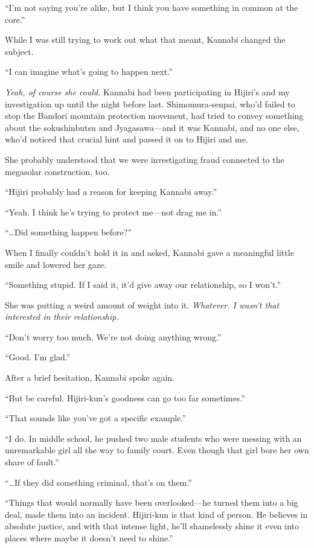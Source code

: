 \documentclass[
    a4paper,
    12pt,
    twoside,
    openany,
    UTF8,
    fontset=windows
]{ctexbook}
\begin{document}
``I'm not saying you're alike, but I think you have something in common at the core.''

While I was still trying to work out what that meant, Kannabi changed the subject.

``I can imagine what's going to happen next.''

\textit{Yeah, of course she could.} Kannabi had been participating in Hijiri's and my investigation up until the night before last. Shimomura-senpai, who'd failed to stop the Bandori mountain protection movement, had tried to convey something about the sokushinbutsu and Jyagasawa---and it was Kannabi, and no one else, who'd noticed that crucial hint and passed it on to Hijiri and me.

She probably understood that we were investigating fraud connected to the megasolar construction, too.

``Hijiri probably had a reason for keeping Kannabi away.''

``Yeah. I think he's trying to protect me---not drag me in.''

``\dots Did something happen before?''

When I finally couldn't hold it in and asked, Kannabi gave a meaningful little smile and lowered her gaze.

``Something stupid. If I said it, it'd give away our relationship, so I won't.''

She was putting a weird amount of weight into it. \textit{Whatever. I wasn't that interested in their relationship.}

``Don't worry too much. We're not doing anything wrong.''

``Good. I'm glad.''

After a brief hesitation, Kannabi spoke again.

``But be careful. Hijiri-kun's goodness can go too far sometimes.''

``That sounds like you've got a specific example.''

``I do. In middle school, he pushed two male students who were messing with an unremarkable girl all the way to family court. Even though that girl bore her own share of fault.''

``\dots If they did something criminal, that's on them.''

``Things that would normally have been overlooked---he turned them into a big deal, made them into an incident. Hijiri-kun is that kind of person. He believes in absolute justice, and with that intense light, he'll shamelessly shine it even into places where maybe it doesn't need to shine.''
\end{document}
